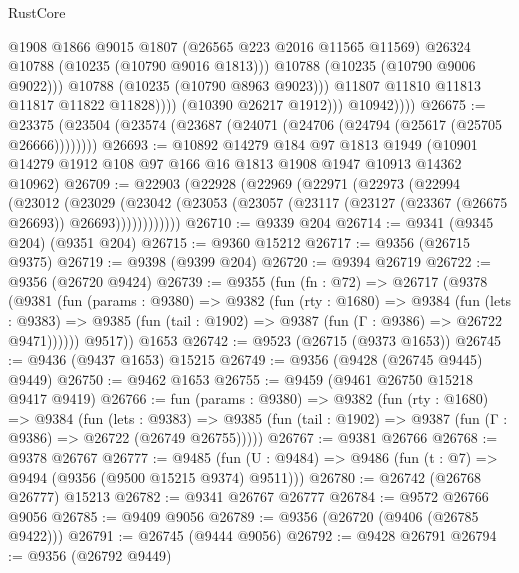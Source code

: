 \begin{lexlean}{RustCore}
\begin{coremodule}
                              @1908
                              @1866
                              @9015
                              @1807
                              (@26565 @223 @2016 @11565 @11569)
                              @26324
                              @10788
                              (@10235 (@10790 @9016 @1813)))
                            @10788
                            (@10235 (@10790 @9006 @9022)))
                          @10788
                          (@10235 (@10790 @8963 @9023)))
                        @11807
                        @11810
                        @11813
                        @11817
                        @11822
                        @11828))))
                (@10390 @26217 @1912)))
            @10942))))
@26675 := @23375 (@23504 (@23574 (@23687 (@24071 (@24706 (@24794 (@25617 (@25705 @26666))))))))
@26693 := @10892
    @14279
    @184
    @97
    @1813
    @1949
    (@10901 @14279 @1912 @108 @97 @166 @16 @1813 @1908 @1947 @10913 @14362 @10962)
@26709 := @22903
    (@22928
      (@22969
        (@22971
          (@22973
            (@22994
              (@23012
                (@23029
                  (@23042
                    (@23053 (@23057 (@23117 (@23127 (@23367 (@26675 @26693)) @26693))))))))))))
@26710 := @9339 @204
@26714 := @9341 (@9345 @204) (@9351 @204)
@26715 := @9360 @15212
@26717 := @9356 (@26715 @9375)
@26719 := @9398 (@9399 @204)
@26720 := @9394 @26719
@26722 := @9356 (@26720 @9424)
@26739 := @9355
    (fun (fn : @72) =>
    @26717
      (@9378
        (@9381
          (fun (params : @9380) =>
          @9382
            (fun (rty : @1680) =>
            @9384
              (fun (lets : @9383) =>
              @9385 (fun (tail : @1902) => @9387 (fun (Γ : @9386) => @26722 @9471))))))
        @9517))
    @1653
@26742 := @9523 (@26715 (@9373 @1653))
@26745 := @9436 (@9437 @1653) @15215
@26749 := @9356 (@9428 (@26745 @9445) @9449)
@26750 := @9462 @1653
@26755 := @9459 (@9461 @26750 @15218 @9417 @9419)
@26766 := fun (params : @9380) =>
  @9382
    (fun (rty : @1680) =>
    @9384
      (fun (lets : @9383) =>
      @9385 (fun (tail : @1902) => @9387 (fun (Γ : @9386) => @26722 (@26749 @26755)))))
@26767 := @9381 @26766
@26768 := @9378 @26767
@26777 := @9485
    (fun (U : @9484) => @9486 (fun (t : @7) => @9494 (@9356 (@9500 @15215 @9374) @9511)))
@26780 := @26742 (@26768 @26777) @15213
@26782 := @9341 @26767 @26777
@26784 := @9572 @26766 @9056
@26785 := @9409 @9056
@26789 := @9356 (@26720 (@9406 (@26785 @9422)))
@26791 := @26745 (@9444 @9056)
@26792 := @9428 @26791
@26794 := @9356 (@26792 @9449)

\end{coremodule}
\end{lexlean}
